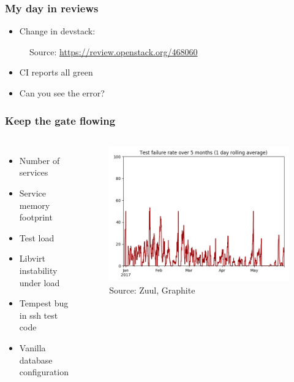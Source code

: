 \documentclass[aspectratio=169,11pt,hyperref={colorlinks=true}]{beamer}
\begin{document}

\begin{frame}
    \frametitle{My day in reviews}
    \begin{itemize}
        \item{Change in devstack:}
    \end{itemize}
    \begin{figure}
    
    \caption{Source: \href{https://review.openstack.org/\#/c/468060/2/lib/tempest@536}{https://review.openstack.org/468060}}
    \end{figure}
    \begin{itemize}
        \item{CI reports all green}
        \item{Can you see the error?}
    \end{itemize}
\end{frame}


\begin{frame}
    \frametitle{Keep the gate flowing}
       \begin{columns}
    \begin{itemize}
        \item{Number of services}
        \item{Service memory footprint}
        \item{Test load}
        \item{Libvirt instability under load}
        \item{Tempest bug in ssh test code}
        \item{Vanilla database configuration}
    \end{itemize}
    \begin{figure}
    \begin{center}
    	\includegraphics[width=1\textwidth]{failure_rate.png}
         \caption{Source: Zuul, Graphite}
    \end{center}
    \end{figure}
       \end{columns}
\end{frame}
\end{document}
